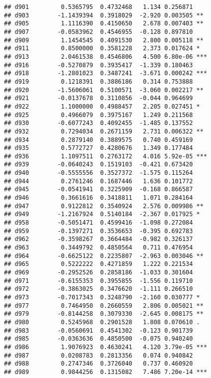 \documentclass[
]{article}
\begin{document}
\begin{verbatim}
## d901         0.5365795  0.4732468   1.134 0.256871    
## d903        -1.1439394  0.3918029  -2.920 0.003505 ** 
## d905         1.1116390  0.4150650   2.678 0.007403 ** 
## d907        -0.0583962  0.4546955  -0.128 0.897810    
## d909         1.1454545  0.4091530   2.800 0.005118 ** 
## d911         0.8500000  0.3581228   2.373 0.017624 *  
## d913         2.0461538  0.4546806   4.500 6.80e-06 ***
## d916        -0.5270879  0.3935417  -1.339 0.180463    
## d918        -1.2801023  0.3487241  -3.671 0.000242 ***
## d919         0.1218391  0.3886186   0.314 0.753888    
## d920        -1.5606061  0.5100571  -3.060 0.002217 ** 
## d921        -0.0137678  0.3110856  -0.044 0.964699    
## d922         1.1000000  0.4988457   2.205 0.027451 *  
## d925         0.4966079  0.3975167   1.249 0.211568    
## d930        -0.6077243  0.4092455  -1.485 0.137552    
## d932         0.7294034  0.2671159   2.731 0.006322 ** 
## d934         0.2879140  0.3889575   0.740 0.459169    
## d935         0.5772727  0.4280676   1.349 0.177484    
## d936         1.1097511  0.2763172   4.016 5.92e-05 ***
## d939        -0.0640243  0.1519103  -0.421 0.673420    
## d940        -0.5555556  0.3527372  -1.575 0.115264    
## d944         0.2761246  0.1687446   1.636 0.101772    
## d945        -0.0541941  0.3225909  -0.168 0.866587    
## d946         0.3661616  0.3418811   1.071 0.284164    
## d947         0.9122812  0.3540924   2.576 0.009986 ** 
## d949        -1.2167924  0.5140184  -2.367 0.017925 *  
## d958        -0.5051471  0.4599416  -1.098 0.272084    
## d959        -0.1397271  0.3536653  -0.395 0.692783    
## d962        -0.3598267  0.3664484  -0.982 0.326137    
## d963         0.3449792  0.4850564   0.711 0.476954    
## d964        -0.6625122  0.2235807  -2.963 0.003046 ** 
## d965         0.5222222  0.4271859   1.222 0.221534    
## d969        -0.2952526  0.2858186  -1.033 0.301604    
## d971        -0.6155353  0.3955855  -1.556 0.119710    
## d972        -0.3863025  0.3476620  -1.111 0.266510    
## d973        -0.7017343  0.3248790  -2.160 0.030777 *  
## d977         0.7464950  0.2660559   2.806 0.005021 ** 
## d979        -0.8144258  0.3079330  -2.645 0.008175 ** 
## d980         0.5245968  0.2901528   1.808 0.070610 .  
## d983        -0.0560691  0.4541302  -0.123 0.901739    
## d985        -0.0363636  0.4850500  -0.075 0.940240    
## d986         1.9076923  0.4630241   4.120 3.79e-05 ***
## d987         0.0208783  0.2813356   0.074 0.940842    
## d988         0.2747346  0.3726040   0.737 0.460920    
## d989         0.9844256  0.1315082   7.486 7.20e-14 ***

\end{verbatim}
\end{document}
